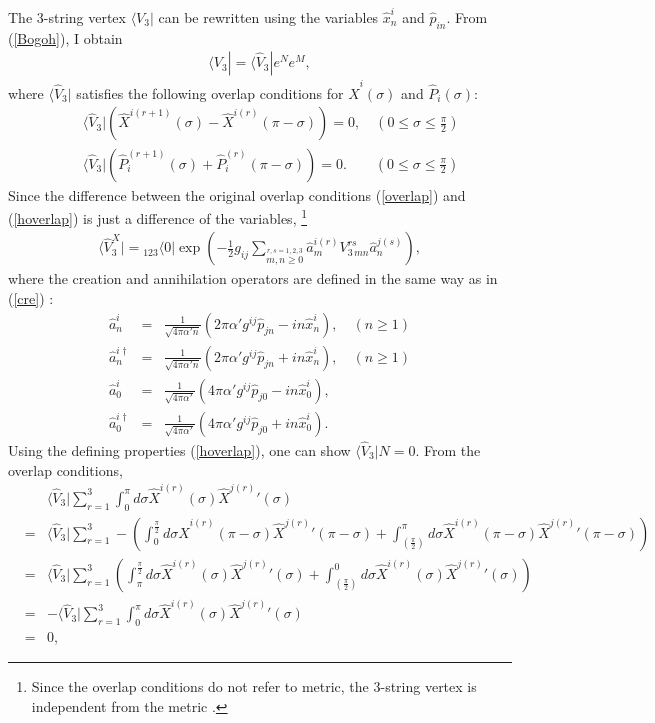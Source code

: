 \documentclass[a4paper,12pt]{article}
\newcommand{\nn}{\nonumber\\}
\def\bra{\langle}
\begin{document}
The 3-string vertex
$\bra V_3 |$
can be rewritten
using the variables $\hat{x}_n^i$ and $\hat{p}_{i n}$.
From (\ref{Bogoh}), I obtain
\begin{eqnarray}
\bra V_3 | = 
\bra \hat{V}_3 | e^N e^M ,
\end{eqnarray}
where $\bra \hat{V}_3 |$ satisfies
the following 
overlap conditions 
for $\hat{X}^i(\sigma)$ and $\hat{P}_i (\sigma)$:
\begin{eqnarray}
 \label{hoverlap}
&& \bra \hat{V}_3 |\left(\hat{X}^{i(r+1)}(\sigma) 
- \hat{X}^{i(r)}(\pi-\sigma)\right) = 0, 
\quad  ( 0 \le \sigma \le \frac{\pi}{2} )\nn
&& \bra \hat{V}_3 |\left(\hat{P}_i^{(r+1)}(\sigma) 
+ \hat{P}_i^{(r)}(\pi-\sigma)\right) = 0 .
\qquad  ( 0 \le \sigma \le \frac{\pi}{2} )
\end{eqnarray}
Since 
the difference between the original
overlap conditions (\ref{overlap})
and (\ref{hoverlap})
is just a difference of the 
variables,
\footnote{
Since the overlap conditions
do not refer to metric, the 3-string vertex is
independent from the metric \cite{KugoZ,KT1}.}
\begin{eqnarray}
 \label{hV3}
\bra \hat{V}_3^X |
=
{}_{123} \bra 0 | 
\exp
\left(
-\frac{1}{2} g_{ij}
\sum_{\stackrel{r,s=1,2,3}{m,n\geq 0}} 
\hat{a}^{i(r)}_m V_{3\,mn}^{rs} \hat{a}_n^{j(s)} 
\right),
\end{eqnarray}
where the 
creation and annihilation operators
are defined in the same way as in (\ref{cre}) :
\begin{eqnarray}
 \label{hcre}
\hat{a}_n^i &=& \frac{1}{\sqrt{4\pi\alpha'n}}
(2\pi\alpha' g^{ij} \hat{p}_{jn} - i n \hat{x}_n^i), 
\quad (n \ge 1) \nn
\hat{a}_n^{i \dagger} &=& \frac{1}{\sqrt{4\pi\alpha'n}}
(2\pi\alpha' g^{ij}  \hat{p}_{jn} + i n \hat{x}_n^i),
\quad (n \ge 1) \nn
\hat{a}_0^i &=& \frac{1}{\sqrt{4\pi\alpha'}}
(4\pi\alpha' g^{ij}\hat{p}_{j0} - i n \hat{x}_0^i), \nn
\hat{a}_0^{i \dagger} &=& \frac{1}{\sqrt{4\pi\alpha'}}
(4\pi\alpha' g^{ij}\hat{p}_{j0} + i n \hat{x}_0^i) .
\end{eqnarray}
Using the defining properties (\ref{hoverlap}),
one can show
$\bra \hat{V}_3 | N = 0$.
From the overlap conditions,
\begin{eqnarray}
 \label{NtoV3}
& &\bra \hat{V}_3 | 
\sum_{r=1}^3
\int_0^\pi d\sigma 
 \hat{X}^{i(r)}(\sigma) \hat{X}^{j(r)}{}' (\sigma) \nn
&=&
\bra \hat{V}_3 | 
\sum_{r=1}^3
-\left(
\int_0^{\frac{\pi}{2}} d\sigma 
 \hat{X}^{i(r)}(\pi-\sigma) 
 \hat{X}^{j(r)}{}' (\pi-\sigma) 
+
\int^\pi_{(\frac{\pi}{2})} d\sigma 
 \hat{X}^{i(r)}(\pi-\sigma) 
 \hat{X}^{j(r)}{}' (\pi-\sigma) 
\right)\nn
&=&
\bra \hat{V}_3 | 
\sum_{r=1}^3
\left(
\int_\pi^{\frac{\pi}{2}} d\sigma 
 \hat{X}^{i(r)}(\sigma) 
 \hat{X}^{j(r)}{}' (\sigma) 
+
\int^0_{(\frac{\pi}{2})} d\sigma 
 \hat{X}^{i(r)}(\sigma) 
 \hat{X}^{j(r)}{}' (\sigma)
\right) \nn
&=&
-
\bra \hat{V}_3 | 
\sum_{r=1}^3
\int_0^\pi d\sigma 
 \hat{X}^{i(r)}(\sigma) \hat{X}^{j(r)}{}' (\sigma) \nn
&=&0 ,
\end{eqnarray}
\end{document}
